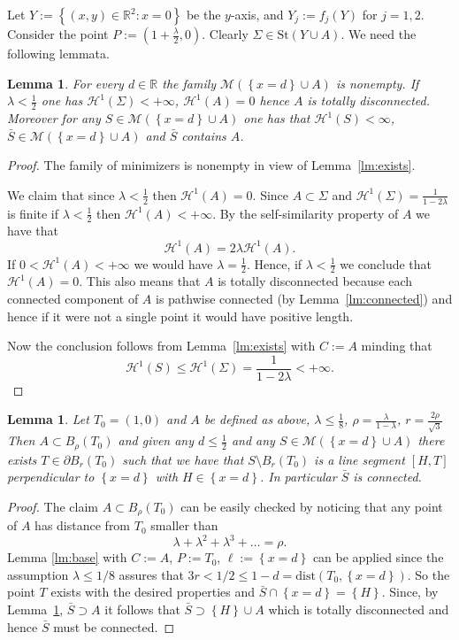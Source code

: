\documentclass{amsart}
\newcommand{\RR}{\mathbb R}
\renewcommand{\H}{\mathcal H}
\newcommand{\ENCLOSE}[1]{\left\{#1\right\}}
\newcommand{\St}{\mathrm{St}}
\newcommand{\M}{\mathcal{M}}
\renewcommand{\H}{\mathcal{H}}
\newcommand{\dist}{\mathrm{dist}}
\newtheorem{lemma}[theorem]{Lemma}
\theoremstyle{definition}
\theoremstyle{remark}
\begin{document}
Let $Y:=\ENCLOSE{(x,y)\in\RR^2\colon x=0}$ be the $y$-axis,
and $Y_j := f_j(Y)$ for $j=1,2$.
Consider the point $P:=(1+\frac\lambda 2,0)$.
Clearly $\Sigma\in \St(Y\cup A)$.
We need the following lemmata.

\begin{lemma}\label{lm:existsA} 
  For every $d\in \RR$ the family $\M(\ENCLOSE{x=d}\cup A)$ is nonempty.
  If $\lambda < \frac 1 2$
  one has $\H^1(\Sigma)<+\infty$, $\H^1(A)=0$ hence $A$ is totally disconnected.
  Moreover for any $S \in \M(\ENCLOSE{x=d}\cup A)$ 
  one has that $\H^1(S)<\infty$,
  $\bar S\in \M(\ENCLOSE{x=d}\cup A)$ and
  $\bar S$ contains $A$.
\end{lemma}
%
\begin{proof}
  The family of minimizers is nonempty in view of Lemma~\ref{lm:exists}.

  We claim that since $\lambda < \frac 1 2$ then $\H^1(A)=0$. 
  Since $A\subset \Sigma$ and $\H^1(\Sigma)=\frac{1}{1-2\lambda}$
  is finite if $\lambda<\frac 1 2$ then $\H^1(A)<+\infty$.
  By the self-similarity property of $A$ we have that 
  \[
  \H^1(A) = 2 \lambda \H^1(A).
  \]
  If $0<\H^1(A)<+\infty$ we would have $\lambda = \frac 1 2$.
  Hence, if $\lambda < \frac 1 2$ we conclude that $\H^1(A)=0$.
  This also means that $A$ is totally disconnected because each connected 
  component of $A$ is pathwise connected (by Lemma~\ref{lm:connected}) 
  and hence if it were not a single point it would have positive length.
    
  Now the conclusion follows from Lemma~\ref{lm:exists} with $C:=A$ 
  minding that 
  \[
    \H^1(S)\le \H^1(\Sigma) = \frac{1}{1-2\lambda}<+\infty.
  \]
\end{proof}

\begin{lemma}\label{lm:01}
  Let $T_0=(1,0)$ and $A$ be defined as above,
  $\lambda \le \frac 1 8$,
  $\rho= \frac{\lambda}{1-\lambda}$,
  $r=\frac{2\rho}{\sqrt 3}$
  Then $A\subset B_\rho(T_0)$ and 
  given any $d\le \frac 1 2$ and any
  $S\in \M(\ENCLOSE{x=d}\cup A)$ 
  there exists $T\in \partial B_r(T_0)$ such that
  we have that $S\setminus B_r(T_0)$ is a line segment
  $[H,T]$ perpendicular to $\ENCLOSE{x=d}$ 
  with $H\in \ENCLOSE{x=d}$.
  In particular $\bar S$ is connected.
\end{lemma}
\begin{proof}
  The claim $A\subset B_\rho(T_0)$ can be easily checked
  by noticing that any point of $A$ has distance
  from $T_0$ smaller than 
  \[
      \lambda + \lambda^2 + \lambda^3 + \dots = \rho.
  \]
  Lemma \ref{lm:base} with $C:=A$, $P:=T_0$, $\ell:=\ENCLOSE{x=d}$ 
  can be applied since the assumption $\lambda \le 1 / 8$ assures 
  that $3r < 1/2 \le 1-d = \dist(T_0,\ENCLOSE{x=d})$.
  So the point $T$ exists with the desired properties and 
  $\bar S\cap \ENCLOSE{x=d} =\ENCLOSE{H}$.
  Since, by Lemma~\ref{lm:existsA}, $\bar S \supset A$
  it follows that $\bar S \supset \ENCLOSE{H}\cup A$ which is totally disconnected 
  and hence $\bar S$ must be connected.
\end{proof}
\end{document}
